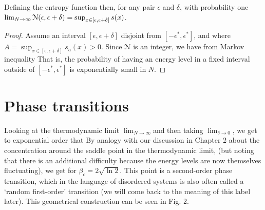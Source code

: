 \documentclass[letterpaper,english,10pt]{article}
\begin{document}
\begin{prop}
Defining the entropy function 
then, for any pair $\epsilon$ and $\delta$, with probability one 
$\lim_{N\to\infty}\mathcal{N}(\epsilon, \epsilon+\delta) = \sup_{x \in [\epsilon, \epsilon+\delta]}s(x)$.
\end{prop}
\begin{proof}
Assume an interval $[\epsilon, \epsilon+\delta]$ disjoint from $[-\epsilon^\ast, \epsilon^\ast]$, 
and 
where $A = \sup_{x \in [\epsilon, \epsilon+\delta]}s_a(x) > 0$. 
Since $\mathcal{N}$ is an integer, we have from Markov inequality 
That is, the probability of having an energy level in a fixed interval outside of $[-\epsilon^\ast, \epsilon^\ast]$ is exponentially small in $N$.
\end{proof}

\section{Phase transitions}
Looking at the thermodynamic limit $\lim_{N \to \infty}$and then taking $\lim_{\delta \to 0}$, 
we get to exponential order that
By analogy with our discussion in Chapter 2 about the concentration around the saddle
point in the thermodynamic limit, (but noting that there is an additional difficulty because the energy levels are now themselves fluctuating), we get
for $\beta_c = 2\sqrt{\ln2}$. 
This point is a second-order phase transition, which in the language of disordered systems is also often called a `random first-order' transition (we will come back to the meaning of this label later). 
This geometrical construction can be seen in Fig. 2.
\end{document}
